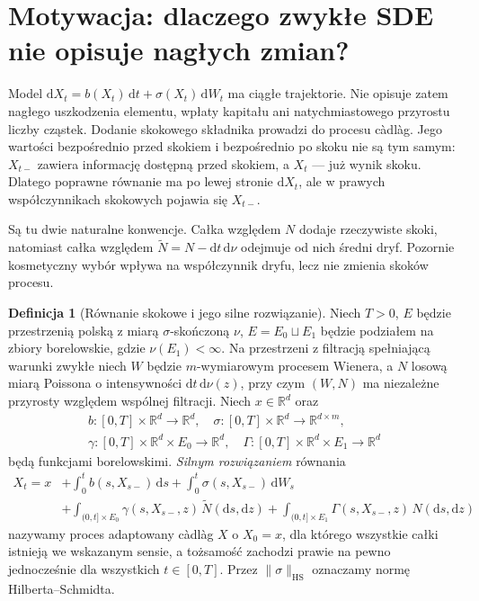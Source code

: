 \documentclass[11pt,a4paper,oneside]{report}
\numberwithin{equation}{chapter}
\theoremstyle{plain}
\theoremstyle{definition}
\newtheorem{definicja}{Definicja}[chapter]
\theoremstyle{remark}
\newcommand{\R}{\mathbb{R}}
\newcommand{\dd}{\mathrm{d}}
\begin{document}
\label{ch:jump-sde}

\section{Motywacja: dlaczego zwykłe SDE nie opisuje nagłych zmian?}\label{sec:volIII:13:01}

Model $\dd X_t=b(X_t)\,\dd t+\sigma(X_t)\,\dd W_t$ ma ciągłe
trajektorie. Nie opisuje zatem nagłego uszkodzenia elementu, wpłaty
kapitału ani natychmiastowego przyrostu liczby cząstek. Dodanie
skokowego składnika prowadzi do procesu càdlàg. Jego wartości
bezpośrednio przed skokiem i bezpośrednio po skoku nie są tym samym:
$X_{t-}$ zawiera informację dostępną przed skokiem, a $X_t$ ---
już wynik skoku. Dlatego poprawne równanie ma po lewej stronie
$\dd X_t$, ale w prawych współczynnikach skokowych pojawia się
$X_{t-}$.

Są tu dwie naturalne konwencje. Całka względem $N$ dodaje
rzeczywiste skoki, natomiast całka względem
$\widetilde N=N-\dd t\,\dd\nu$ odejmuje od nich średni dryf.
Pozornie kosmetyczny wybór wpływa na współczynnik dryfu, lecz
nie zmienia skoków procesu.

\begin{definicja}[Równanie skokowe i jego silne rozwiązanie]\label{def:volIII:13:01}
\label{def:jump-sde}
Niech $T>0$, $E$ będzie przestrzenią polską z miarą
$\sigma$-skończoną $\nu$, $E=E_0\sqcup E_1$ będzie podziałem
na zbiory borelowskie, gdzie $\nu(E_1)<\infty$.
Na przestrzeni z filtracją spełniającą warunki zwykłe niech $W$
będzie $m$-wymiarowym procesem Wienera, a $N$ losową miarą
Poissona o intensywności $\dd t\,\dd\nu(z)$, przy czym
$(W,N)$ ma niezależne przyrosty względem wspólnej filtracji.
Niech $x\in\R^d$ oraz
\[
\begin{gathered}
b:[0,T]\times\R^d\to\R^d,\quad
\sigma:[0,T]\times\R^d\to\R^{d\times m},\\
\gamma:[0,T]\times\R^d\times E_0\to\R^d,\quad
\Gamma:[0,T]\times\R^d\times E_1\to\R^d
\end{gathered}
\]
będą funkcjami borelowskimi. \emph{Silnym rozwiązaniem} równania
\[
\begin{split}
X_t=x&+\int_0^t b(s,X_{s-})\,\dd s
 +\int_0^t\sigma(s,X_{s-})\,\dd W_s\\
&+\int_{(0,t]\times E_0}\gamma(s,X_{s-},z)\,\widetilde N(\dd s,\dd z)
 +\int_{(0,t]\times E_1}\Gamma(s,X_{s-},z)\,N(\dd s,\dd z)
\end{split}
\tag{13.1}\label{eq:jump-sde}
\]
nazywamy proces adaptowany càdlàg $X$ o $X_0=x$, dla którego
wszystkie całki istnieją we wskazanym sensie, a tożsamość zachodzi
prawie na pewno jednocześnie dla wszystkich $t\in[0,T]$.
Przez $\|\sigma\|_{\mathrm{HS}}$ oznaczamy normę Hilberta--Schmidta.
\end{definicja}
\end{document}
